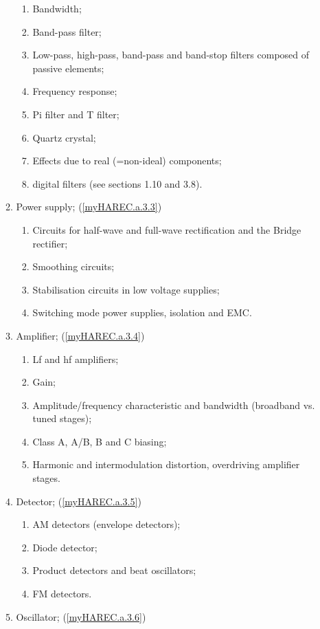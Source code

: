 \begin{enumerate}
\begin{enumerate}[noitemsep]
\begin{enumerate}[noitemsep]
\item Bandwidth;
\item Band-pass filter;
\item Low-pass, high-pass, band-pass and band-stop filters composed of passive elements;
\item Frequency response;
\item Pi filter and T filter;
\item Quartz crystal;
\item Effects due to real (=non-ideal) components;
\item digital filters (see sections 1.10 and 3.8).
\end{enumerate}
\item Power supply; (\ref{myHAREC.a.3.3})\label{HAREC.a.3.3}
\begin{enumerate}[noitemsep]
\item Circuits for half-wave and full-wave rectification and the Bridge rectifier;
\item Smoothing circuits;
\item Stabilisation circuits in low voltage supplies;
\item Switching mode power supplies, isolation and EMC.
\end{enumerate}
\item Amplifier; (\ref{myHAREC.a.3.4})\label{HAREC.a.3.4}
\begin{enumerate}[noitemsep]
\item Lf and hf amplifiers;
\item Gain;
\item Amplitude/frequency characteristic and bandwidth (broadband vs. tuned stages);
\item Class A, A/B, B and C biasing;
\item Harmonic and intermodulation distortion, overdriving amplifier stages.
\end{enumerate}
\item Detector; (\ref{myHAREC.a.3.5})\label{HAREC.a.3.5}
\begin{enumerate}[noitemsep]
\item AM detectors (envelope detectors);
\item Diode detector;
\item Product detectors and beat oscillators;
\item FM detectors.
\end{enumerate}
\item Oscillator; (\ref{myHAREC.a.3.6})\label{HAREC.a.3.6}
\begin{enumerate}[noitemsep]

\end{enumerate}
\end{enumerate}
\end{enumerate}
